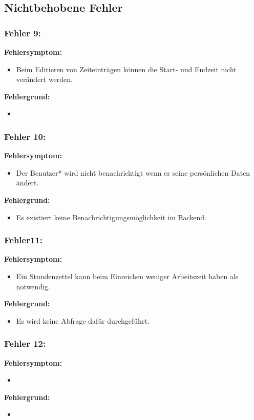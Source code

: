 \newpage

\subsection{Nichtbehobene Fehler}

\subsubsection{Fehler 9:}%
\textbf{Fehlersymptom:}
	\begin{itemize}
		\item Beim Editieren von Zeiteinträgen können die Start- und Endzeit nicht verändert werden.
	\end{itemize}
\textbf{Fehlergrund:}
	\begin{itemize}
		\item 
	\end{itemize}
	
\subsubsection{Fehler 10:}%
\textbf{Fehlersymptom:}
	\begin{itemize}
		\item Der Benutzer* wird nicht benachrichtigt wenn er seine persönlichen Daten ändert.
	\end{itemize}
\textbf{Fehlergrund:}
	\begin{itemize}
		\item Es existiert keine Benachrichtigungsmöglichkeit im Backend.
	\end{itemize}
	
\subsubsection{Fehler11:}%
\textbf{Fehlersymptom:}
	\begin{itemize}
		\item Ein Stundenzettel kann beim Einreichen weniger Arbeitszeit haben als notwendig.
	\end{itemize}
\textbf{Fehlergrund:}
	\begin{itemize}
		\item Es wird keine Abfrage dafür durchgeführt.
	\end{itemize}
	
\subsubsection{Fehler 12:}%
\textbf{Fehlersymptom:}
	\begin{itemize}
		\item 
	\end{itemize}
\textbf{Fehlergrund:}
	\begin{itemize}
		\item 
	\end{itemize}
	
